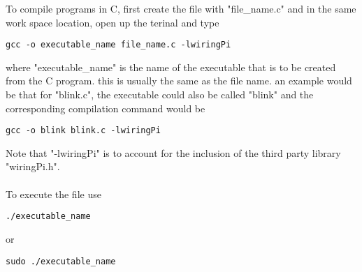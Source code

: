 \documentclass{article}
\begin{document}
\noindent
To compile programs in C, first create the file with "file\_name.c" and in the same work space location, open up the terinal and type
\begin{verbatim}
gcc -o executable_name file_name.c -lwiringPi
\end{verbatim}
where "executable\_name" is the name of the executable that is to be created from the C program. this is usually the same as the file name. an example would be that for "blink.c", the executable could also be called "blink" and the corresponding compilation command would be
\begin{verbatim}
gcc -o blink blink.c -lwiringPi
\end{verbatim}
Note that "-lwiringPi" is to account for the inclusion of the third party library "wiringPi.h".\\\\ To execute the file use
\begin{verbatim}
./executable_name
\end{verbatim}
or
\begin{verbatim}
sudo ./executable_name
\end{verbatim}
\end{document}

